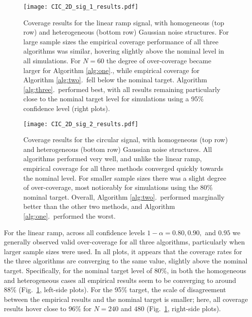 \begin{figure}[!htbp]
\hspace*{-3.0cm}
\centering
    \texttt{[image: CIC\_2D\_sig\_1\_results.pdf]}
\caption{Coverage results for the linear ramp signal, with homogeneous (top row) and heterogeneous (bottom row) Gaussian noise structures. For large sample sizes the empirical coverage performance of all three algorithms was similar, hovering slightly above the nominal level in all simulations. For $N = 60$ the degree of over-coverage became larger for Algorithm \ref{alg:one}., while empirical coverage for Algorithm \ref{alg:two}.\ fell below the nominal target. Algorithm \ref{alg:three}.\ performed best, with all results remaining particularly close to the nominal target level for simulations using a 95\% confidence level (right plots).}
\label{fig:Cohen_2D_sig_1_results}
\end{figure}


\begin{figure}[!htbp]
\hspace*{-3.0cm}
\centering
    \texttt{[image: CIC\_2D\_sig\_2\_results.pdf]}
\caption{Coverage results for the circular signal, with homogeneous (top row) and heterogeneous (bottom row) Gaussian noise structures. All algorithms performed very well, and unlike the linear ramp, empirical coverage for all three methods converged quickly towards the nominal level. For smaller sample sizes there was a slight degree of over-coverage, most noticeably for simulations using the 80\% nominal target. Overall, Algorithm \ref{alg:two}.\ performed marginally better than the other two methods, and Algorithm \ref{alg:one}.\ performed the worst.}
\label{fig:Cohen_2D_sig_2_results}
\end{figure}

For the linear ramp, across all confidence levels $1 - \alpha = 0.80, 0.90,$ and $0.95$ we generally observed valid over-coverage for all three algorithms, particularly when larger sample sizes were used. In all plots, it appears that the coverage rates for the three algorithms are converging to the same value, slightly above the nominal target. Specifically, for the nominal target level of 80\%, in both the homogeneous and heterogeneous cases all empirical results seem to be converging to around 88\% (Fig.\ \ref{fig:Cohen_2D_sig_1_results}, left-side plots). For the 95\% target, the scale of disagreement between the empirical results and the nominal target is smaller; here, all coverage results hover close to 96\% for $N = 240$ and $480$ (Fig.\ \ref{fig:Cohen_2D_sig_1_results}, right-side plots).

